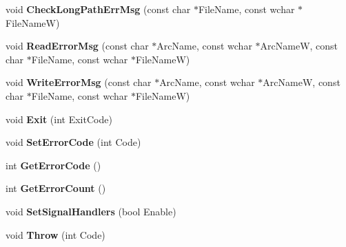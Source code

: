 \begin{DoxyCompactItemize}
\item 
\hypertarget{class_error_handler_aeeeb484b88af6f8911ea537fba35ac54}{void {\bfseries Check\-Long\-Path\-Err\-Msg} (const char $\ast$File\-Name, const wchar $\ast$File\-Name\-W)}\label{class_error_handler_aeeeb484b88af6f8911ea537fba35ac54}

\item 
\hypertarget{class_error_handler_af808d21777b932172c0f5808b074e6fc}{void {\bfseries Read\-Error\-Msg} (const char $\ast$Arc\-Name, const wchar $\ast$Arc\-Name\-W, const char $\ast$File\-Name, const wchar $\ast$File\-Name\-W)}\label{class_error_handler_af808d21777b932172c0f5808b074e6fc}

\item 
\hypertarget{class_error_handler_ade8b41d944a3c8291bcdc647c59ef8e4}{void {\bfseries Write\-Error\-Msg} (const char $\ast$Arc\-Name, const wchar $\ast$Arc\-Name\-W, const char $\ast$File\-Name, const wchar $\ast$File\-Name\-W)}\label{class_error_handler_ade8b41d944a3c8291bcdc647c59ef8e4}

\item 
\hypertarget{class_error_handler_ab4df1a5a4550a6c8afebb6d6631439b0}{void {\bfseries Exit} (int Exit\-Code)}\label{class_error_handler_ab4df1a5a4550a6c8afebb6d6631439b0}

\item 
\hypertarget{class_error_handler_a12a27859f5b079ee7cf18713d6abda4e}{void {\bfseries Set\-Error\-Code} (int Code)}\label{class_error_handler_a12a27859f5b079ee7cf18713d6abda4e}

\item 
\hypertarget{class_error_handler_a04b649c09b0a16861b3b4c7d0170c277}{int {\bfseries Get\-Error\-Code} ()}\label{class_error_handler_a04b649c09b0a16861b3b4c7d0170c277}

\item 
\hypertarget{class_error_handler_a82f5fc590a7a0e7f806f2372d842db39}{int {\bfseries Get\-Error\-Count} ()}\label{class_error_handler_a82f5fc590a7a0e7f806f2372d842db39}

\item 
\hypertarget{class_error_handler_a68b0990729a2f4fa40ed26e19cfe1d40}{void {\bfseries Set\-Signal\-Handlers} (bool Enable)}\label{class_error_handler_a68b0990729a2f4fa40ed26e19cfe1d40}

\item 
\hypertarget{class_error_handler_a275bc9640f6927bc491df82c5219f147}{void {\bfseries Throw} (int Code)}\label{class_error_handler_a275bc9640f6927bc491df82c5219f147}


\end{DoxyCompactItemize}
